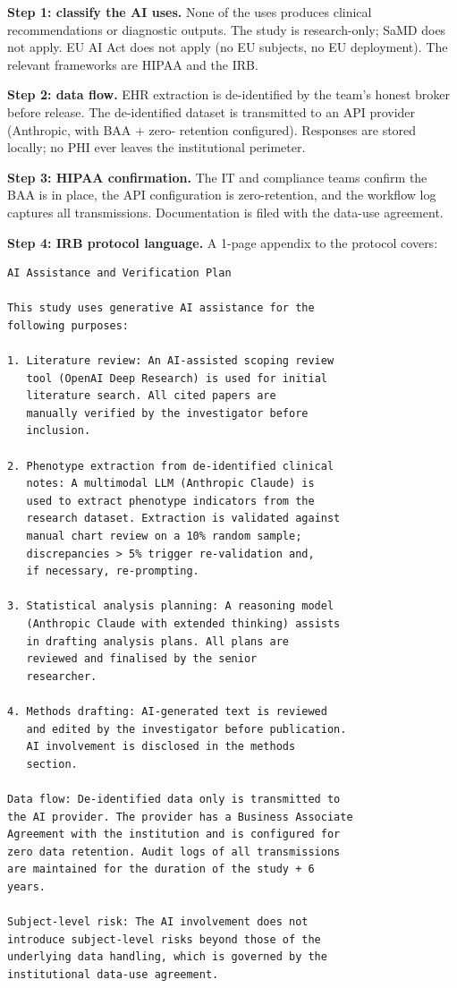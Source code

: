 \documentclass[
  letterpaper,
  11pt]{scrbook}
\begin{document}
\textbf{Step 1: classify the AI uses.} None of the uses produces
clinical recommendations or diagnostic outputs. The study is
research-only; SaMD does not apply. EU AI Act does not apply (no EU
subjects, no EU deployment). The relevant frameworks are HIPAA and the
IRB.

\textbf{Step 2: data flow.} EHR extraction is de-identified by the
team's honest broker before release. The de-identified dataset is
transmitted to an API provider (Anthropic, with BAA + zero- retention
configured). Responses are stored locally; no PHI ever leaves the
institutional perimeter.

\textbf{Step 3: HIPAA confirmation.} The IT and compliance teams confirm
the BAA is in place, the API configuration is zero-retention, and the
workflow log captures all transmissions. Documentation is filed with the
data-use agreement.

\textbf{Step 4: IRB protocol language.} A 1-page appendix to the
protocol covers:

\begin{verbatim}
AI Assistance and Verification Plan

This study uses generative AI assistance for the
following purposes:

1. Literature review: An AI-assisted scoping review
   tool (OpenAI Deep Research) is used for initial
   literature search. All cited papers are
   manually verified by the investigator before
   inclusion.

2. Phenotype extraction from de-identified clinical
   notes: A multimodal LLM (Anthropic Claude) is
   used to extract phenotype indicators from the
   research dataset. Extraction is validated against
   manual chart review on a 10% random sample;
   discrepancies > 5% trigger re-validation and,
   if necessary, re-prompting.

3. Statistical analysis planning: A reasoning model
   (Anthropic Claude with extended thinking) assists
   in drafting analysis plans. All plans are
   reviewed and finalised by the senior
   researcher.

4. Methods drafting: AI-generated text is reviewed
   and edited by the investigator before publication.
   AI involvement is disclosed in the methods
   section.

Data flow: De-identified data only is transmitted to
the AI provider. The provider has a Business Associate
Agreement with the institution and is configured for
zero data retention. Audit logs of all transmissions
are maintained for the duration of the study + 6
years.

Subject-level risk: The AI involvement does not
introduce subject-level risks beyond those of the
underlying data handling, which is governed by the
institutional data-use agreement.
\end{verbatim}
\end{document}
